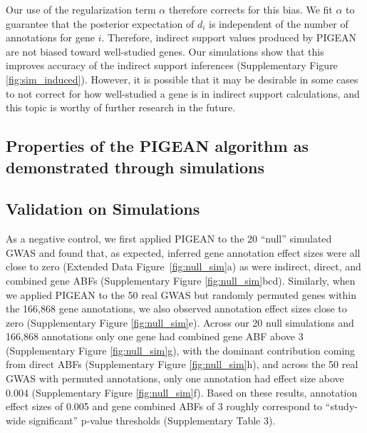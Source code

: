 \documentclass[11pt]{article}
\begin{document}
{Our use of the regularization term $\alpha$ therefore corrects for
this bias. We fit $\alpha$ to guarantee that the posterior expectation
of $d_i$ is independent of the number of annotations for gene
$i$. Therefore, indirect support values produced by PIGEAN are not
biased toward well-studied genes. Our
simulations show that this improves accuracy of the indirect support
inferences (Supplementary Figure \ref{fig:sim_induced}). 
However, it is possible that it may be desirable in some cases to not correct for
how well-studied a gene is in indirect support calculations, and this
topic is worthy of further research in the future.

\subsection{Properties of the PIGEAN algorithm as demonstrated through
  simulations}

\subsection{Validation on Simulations}\label{sec:simval}
As a negative control, we first applied PIGEAN to the 20 “null” simulated GWAS and found that, as expected, inferred gene annotation effect sizes were all close to zero (Extended Data Figure~\ref{fig:null_sim}a) as were indirect, direct, and combined gene ABFs (Supplementary Figure \ref{fig:null_sim}bcd). Similarly, when we applied PIGEAN to the 50 real GWAS but randomly permuted genes within the 166,868 gene annotations, we also observed annotation effect sizes close to zero (Supplementary  Figure \ref{fig:null_sim}e). Across our 20 null simulations and 166,868 annotations only one gene had combined gene ABF above 3 (Supplementary Figure \ref{fig:null_sim}g), with the dominant contribution coming from direct ABFs (Supplementary Figure \ref{fig:null_sim}h), and across the 50 real GWAS with permuted annotations, only one annotation had effect size above 0.004 (Supplementary Figure \ref{fig:null_sim}f). Based on these results, annotation effect sizes of 0.005 and gene combined ABFs of 3 roughly correspond to “study-wide significant” p-value thresholds (Supplementary Table 3).

}
\end{document}

